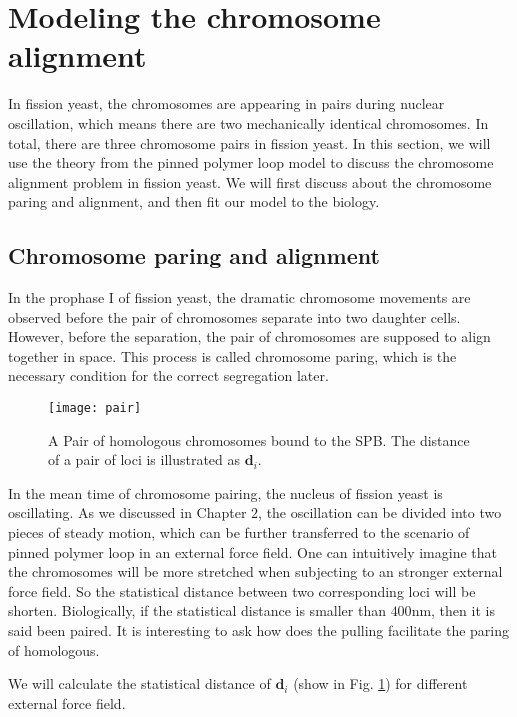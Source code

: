 \section{Modeling the chromosome alignment}
\label{sec:modeling_the_chromosome_alignment}
In fission yeast, the chromosomes are appearing in pairs during nuclear oscillation, which means there are two mechanically identical chromosomes. In total, there are three chromosome pairs in fission yeast. In this section, we will use the theory from the pinned polymer loop model to discuss the chromosome alignment problem in fission yeast. We will first discuss about the chromosome paring and alignment, and then fit our model to the biology.

\subsection{Chromosome paring and alignment}
\label{sub:chromosome_paring_and_alignment}

In the prophase I of fission yeast, the dramatic chromosome movements are observed before the pair of chromosomes separate into two daughter cells. However, before the separation, the pair of chromosomes are supposed to align together in space. This process is called chromosome paring, which is the necessary condition for the correct segregation later.


\begin{figure}[htpb]
    \centering
    \texttt{[image: pair]}
    \caption{A Pair of homologous chromosomes bound to the SPB. The distance of a pair of loci is illustrated as $\mathbf{d}_i$. }
    \label{fig:pair}
\end{figure}

In the mean time of chromosome pairing, the nucleus of fission yeast is oscillating. As we discussed in Chapter $2$, the oscillation can be divided into two pieces of steady motion, which can be further transferred to the scenario of pinned polymer loop in an external force field. One can intuitively imagine that the chromosomes will be more stretched when subjecting to an stronger external force field. So the statistical distance between two corresponding loci will be shorten. Biologically, if the statistical distance is smaller than $400$nm, then it is said been paired. It is interesting to ask how does the pulling facilitate the paring of homologous. 

We will calculate the statistical distance of $\mathbf{d}_i$ (show in Fig. \ref{fig:pair}) for different external force field. 



